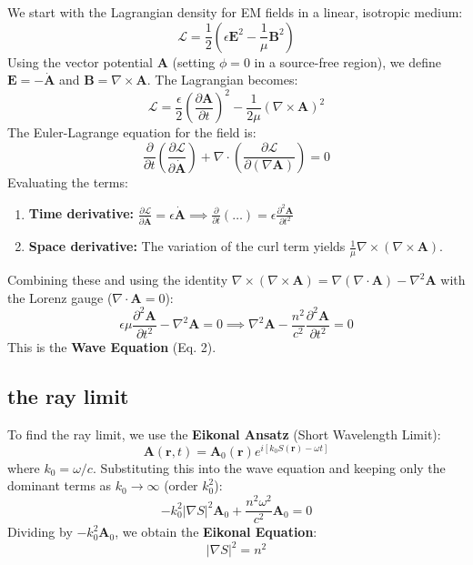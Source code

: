\documentclass[12pt,a4paper]{article}
\begin{document}
\begin{tcolorbox}[colback=blue!5!white,colframe=blue!75!black,title=Box 1: Deriving the Wave Equation from $\mathcal{L}$]
We start with the Lagrangian density for EM fields in a linear, isotropic medium:
$$\mathcal{L} = \frac{1}{2} \left( \epsilon \mathbf{E}^2 - \frac{1}{\mu} \mathbf{B}^2 \right)$$
Using the vector potential $\mathbf{A}$ (setting $\phi = 0$ in a source-free region), we define $\mathbf{E} = -\dot{\mathbf{A}}$ and $\mathbf{B} = \nabla \times \mathbf{A}$. The Lagrangian becomes:
$$\mathcal{L} = \frac{\epsilon}{2} \left( \frac{\partial \mathbf{A}}{\partial t} \right)^2 - \frac{1}{2\mu} (\nabla \times \mathbf{A})^2$$
The Euler-Lagrange equation for the field is:
$$\frac{\partial}{\partial t} \left( \frac{\partial \mathcal{L}}{\partial \dot{\mathbf{A}}} \right) + \nabla \cdot \left( \frac{\partial \mathcal{L}}{\partial (\nabla \mathbf{A})} \right) = 0$$
Evaluating the terms:
\begin{enumerate}
    \item \textbf{Time derivative:} $\frac{\partial \mathcal{L}}{\partial \dot{\mathbf{A}}} = \epsilon \dot{\mathbf{A}} \implies \frac{\partial}{\partial t}(\dots) = \epsilon \frac{\partial^2 \mathbf{A}}{\partial t^2}$
    \item \textbf{Space derivative:} The variation of the curl term yields $\frac{1}{\mu} \nabla \times (\nabla \times \mathbf{A})$.
\end{enumerate}
Combining these and using the identity $\nabla \times (\nabla \times \mathbf{A}) = \nabla(\nabla \cdot \mathbf{A}) - \nabla^2 \mathbf{A}$ with the Lorenz gauge ($\nabla \cdot \mathbf{A} = 0$):
$$\epsilon \mu \frac{\partial^2 \mathbf{A}}{\partial t^2} - \nabla^2 \mathbf{A} = 0 \implies \nabla^2 \mathbf{A} - \frac{n^2}{c^2} \frac{\partial^2 \mathbf{A}}{\partial t^2} = 0$$
This is the \textbf{Wave Equation} (Eq. 2).
\end{tcolorbox}

\subsection{the ray limit}
To find the ray limit, we use the \textbf{Eikonal Ansatz} (Short Wavelength Limit):
\begin{equation}
\mathbf{A}(\mathbf{r}, t) = \mathbf{A}_0(\mathbf{r}) e^{i [k_0 S(\mathbf{r}) - \omega t]}
\end{equation}
where $k_0 = \omega/c$. Substituting this into the wave equation and keeping only the dominant terms as $k_0 \to \infty$ (order $k_0^2$):
\begin{equation}
-k_0^2 |\nabla S|^2 \mathbf{A}_0 + \frac{n^2 \omega^2}{c^2} \mathbf{A}_0 = 0
\end{equation}
Dividing by $-k_0^2 \mathbf{A}_0$, we obtain the \textbf{Eikonal Equation}:
\begin{equation}
|\nabla S|^2 = n^2
\end{equation}
\end{document}
